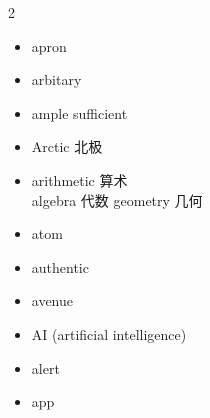 \documentclass[../../book.tex]{subfiles}
\begin{document}
\begin{multicols}{2}
\begin{itemize}
\item[-] apron
\item[-] arbitary
\item[-] ample sufficient
\item[-] Arctic 北极
\item[-] arithmetic 算术
\\algebra 代数 geometry 几何
\item[-] atom
\item[-] authentic
\item[-] avenue
\item[-] AI (artificial intelligence)
\item[-] alert
\item[-] app
\end{itemize}
\end{multicols}
\end{document}
